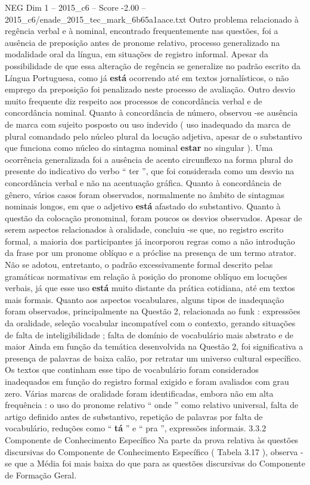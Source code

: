 \begin{textsample}{NEG Dim 1 – 2015\_c6 – Score -2.00 – 2015\_c6/enade\_2015\_tec\_mark\_6b65a1aace.txt}
Outro problema relacionado à regência verbal e à nominal, encontrado frequentemente nas questões, foi a ausência de preposição antes de pronome relativo, processo generalizado na modalidade oral da língua, em situações de registro informal.
Apesar da possibilidade de que essa alteração de regência se generalize no padrão escrito da Língua Portuguesa, como já \textbf{está} ocorrendo até em textos jornalísticos, o não emprego da preposição foi penalizado neste processo de avaliação.
Outro desvio muito frequente diz respeito aos processos de concordância verbal e de concordância nominal.
Quanto à concordância de número, observou -se ausência de marca com sujeito posposto ou uso indevido ( uso inadequado da marca de plural comandado pelo núcleo plural da locução adjetiva, apesar de o substantivo que funciona como núcleo do sintagma nominal \textbf{estar} no singular ).
Uma ocorrência generalizada foi a ausência de acento circunflexo na forma plural do presente do indicativo do verbo “ ter ”, que foi considerada como um desvio na concordância verbal e não na acentuação gráfica.
Quanto à concordância de gênero, vários casos foram observados, normalmente no âmbito de sintagmas nominais longos, em que o adjetivo \textbf{está} afastado do substantivo.
Quanto à questão da colocação pronominal, foram poucos os desvios observados.
Apesar de serem aspectos relacionados à oralidade, concluiu -se que, no registro escrito formal, a maioria dos participantes já incorporou regras como a não introdução da frase por um pronome oblíquo e a próclise na presença de um termo atrator.
Não se adotou, entretanto, o padrão excessivamente formal descrito pelas gramáticas normativas em relação à posição do pronome oblíquo em locuções verbais, já que esse uso \textbf{está} muito distante da prática cotidiana, até em textos mais formais.
Quanto aos aspectos vocabulares, alguns tipos de inadequação foram observados, principalmente na Questão 2, relacionada ao funk : expressões da oralidade, seleção vocabular incompatível com o contexto, gerando situações de falta de inteligibilidade ; falta de domínio de vocabulário mais abstrato e de maior Ainda em função da temática desenvolvida na Questão 2, foi significativa a presença de palavras de baixa calão, por retratar um universo cultural específico.
Os textos que continham esse tipo de vocabulário foram considerados inadequados em função do registro formal exigido e foram avaliados com grau zero.
Várias marcas de oralidade foram identificadas, embora não em alta frequência : o uso do pronome relativo “ onde ” como relativo universal, falta de artigo definido antes de substantivo, repetição de palavras por falta de vocabulário, reduções como “ \textbf{tá} ” e “ pra ”, expressões informais. 3.3.2 Componente de Conhecimento Específico Na parte da prova relativa às questões discursivas do Componente de Conhecimento Específico ( Tabela 3.17 ), observa -se que a Média foi mais baixa do que para as questões discursivas do Componente de Formação Geral.

\end{textsample}
